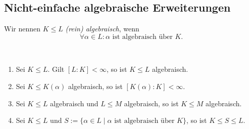 \subsection{Nicht-einfache algebraische Erweiterungen}

\begin{definition}
    Wir nennen $K \leq L$ \emph{(rein) algebraisch}, wenn
    $$ \forall \alpha \in L: \alpha \text{ ist algebraisch über } K. $$
\end{definition}

\begin{proposition}{\ }
    \begin{enumerate}
        \item Sei $K \leq L$. Gilt $[L:K] < \infty$, so ist $K \leq L$ algebraisch.
        \item Sei $K \leq K(\alpha)$ algebraisch, so ist $[K(\alpha) : K] < \infty$.
        \item Sei $K \leq L$ algebraisch und $L \leq M$ algebraisch, so ist $K \leq M$ algebraisch.
        \item Sei $K \leq L$ und $S := \{ \alpha \in L \mid \alpha \text{ ist algebraisch über } K \}$, so ist $K \leq S \leq L$.
    \end{enumerate}
\end{proposition}

